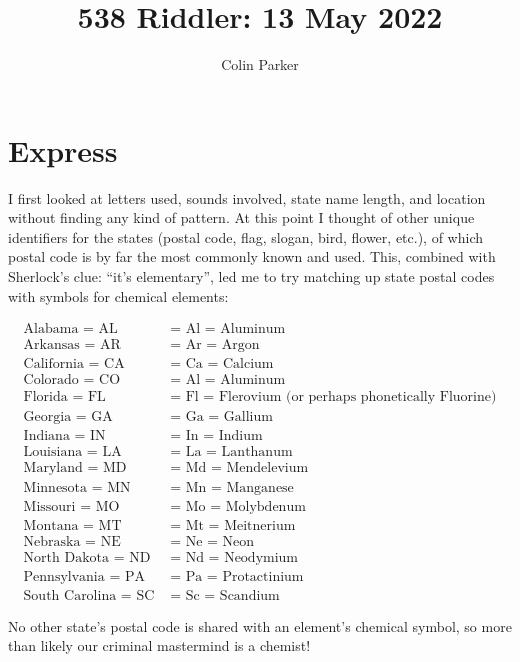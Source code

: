 \documentclass[11pt]{article} %
\title{538 Riddler: 13 May 2022}
\author{Colin Parker}
\begin{document}
\maketitle

\section{Express}
I first looked at letters used, sounds involved, state name length, and location without finding any kind of pattern.
At this point I thought of other unique identifiers for the states (postal code, flag, slogan, bird, flower, etc.), of which
postal code is by far the most commonly known and used. This, combined with Sherlock's clue: ``it's elementary'',
led me to try matching up state postal codes with symbols for chemical elements:

\begin{align*}
\text{Alabama = AL } & \text{= Al = Aluminum} \\
\text{Arkansas = AR } & \text{= Ar = Argon} \\
\text{California = CA } & \text{= Ca = Calcium} \\
\text{Colorado = CO } & \text{= Al = Aluminum} \\
\text{Florida = FL } & \text{= Fl = Flerovium (or perhaps phonetically Fluorine)} \\
\text{Georgia = GA } & \text{= Ga = Gallium} \\
\text{Indiana = IN } & \text{= In = Indium} \\
\text{Louisiana = LA } & \text{= La = Lanthanum} \\
\text{Maryland = MD } & \text{= Md = Mendelevium} \\
\text{Minnesota = MN } & \text{= Mn = Manganese} \\
\text{Missouri = MO } & \text{= Mo = Molybdenum} \\
\text{Montana = MT } & \text{= Mt = Meitnerium} \\
\text{Nebraska = NE } & \text{= Ne = Neon} \\
\text{North Dakota = ND } & \text{= Nd = Neodymium} \\
\text{Pennsylvania = PA } & \text{= Pa = Protactinium} \\
\text{South Carolina = SC } & \text{= Sc = Scandium}
\end{align*}

No other state's postal code is shared with an element's chemical symbol, so more than likely our criminal
mastermind is a chemist!
\end{document}

